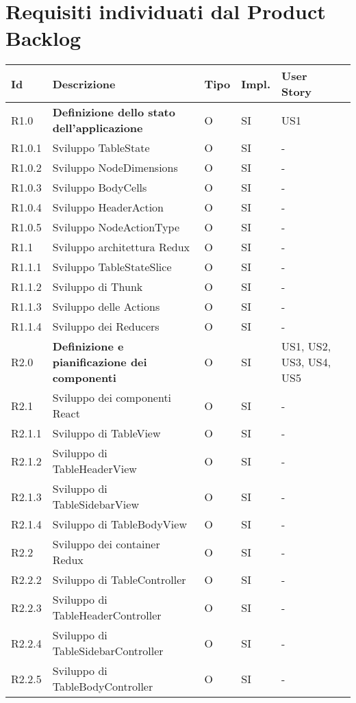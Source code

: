 \section{Requisiti individuati dal Product Backlog}
\begin{longtable} {
		|>{}p{10mm}| 
		|>{}p{60mm}|
		|>{}p{15mm}|
		|>{}p{15mm}|
		|>{}p{15mm}|
		>{}p{0mm}}
	\hline
	\textbf{Id} & \textbf{Descrizione} & \textbf{Tipo} & \textbf{Impl.} & \textbf{User Story} \\ \hline
	
	R1.0   & \textbf{Definizione dello stato dell'applicazione} & O & SI & US1\\ \hline
	R1.0.1 & Sviluppo TableState        & O & SI & -\\ \hline
	R1.0.2 & Sviluppo NodeDimensions    & O & SI & -\\ \hline
	R1.0.3 & Sviluppo BodyCells         & O & SI & -\\ \hline
	R1.0.4 & Sviluppo HeaderAction      & O & SI & -\\ \hline
	R1.0.5 & Sviluppo NodeActionType    & O & SI & -\\ \hline
	R1.1   & Sviluppo architettura Redux & O & SI & - \\ \hline
	R1.1.1 & Sviluppo TableStateSlice    & O & SI & - \\ \hline
	R1.1.2 & Sviluppo di Thunk & O & SI & - \\ \hline
	R1.1.3 & Sviluppo delle Actions & O & SI & - \\ \hline
	R1.1.4 & Sviluppo dei Reducers & O & SI & - \\ \hline
	
	R2.0   & \textbf{Definizione e pianificazione dei componenti} & O & SI & US1, US2, US3, US4, US5\\ \hline
	R2.1   & Sviluppo dei componenti React 		  & O & SI & - \\ \hline
	R2.1.1 & Sviluppo di TableView                & O & SI & -     \\ \hline
	R2.1.2 & Sviluppo di TableHeaderView          & O & SI & -     \\ \hline
	R2.1.3 & Sviluppo di TableSidebarView         & O & SI & -     \\ \hline
	R2.1.4 & Sviluppo di TableBodyView            & O & SI & -     \\ \hline
	R2.2   & Sviluppo dei container Redux         & O & SI & -     \\ \hline
	R2.2.2 & Sviluppo di TableController          & O & SI & -     \\ \hline
	R2.2.3 & Sviluppo di TableHeaderController    & O & SI & -     \\ \hline
	R2.2.4 & Sviluppo di TableSidebarController   & O & SI & -     \\ \hline
	R2.2.5 & Sviluppo di TableBodyController      & O & SI & -     \\ \hline


\end{longtable}
